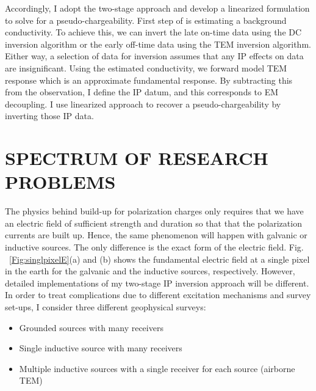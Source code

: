 \documentclass[letterpaper,11pt]{article}
\begin{document}


Accordingly, I adopt the two-stage approach and develop a linearized formulation to solve for a pseudo-chargeability. First step of is estimating a background conductivity. To achieve this, we can invert the late on-time data using the DC inversion algorithm or the early off-time data using the TEM inversion algorithm. Either way, a selection of data for inversion assumes that any IP effects on data are insignificant. Using the estimated conductivity, we forward model TEM response which is an approximate fundamental response. By subtracting this from the observation, I define the IP datum, and this corresponds to EM decoupling. I use linearized approach to recover a pseudo-chargeability by inverting those IP data. 

\section{SPECTRUM OF RESEARCH PROBLEMS}
The physics behind build-up for polarization charges only requires that we have an electric field of sufficient strength and duration so that that the polarization currents are built up. Hence, the same phenomenon will happen with galvanic or inductive sources. The only difference is the exact form of the electric field. Fig. ~\ref{Fig:singlpixelE}(a) and (b) shows the fundamental electric field at a single pixel in the earth for the galvanic and the inductive sources, respectively. However, detailed implementations of my two-stage IP inversion approach will be different. In order to treat complications due to different excitation mechanisms and survey set-ups, I consider three different geophysical surveys:
\begin{itemize}
  \item Grounded sources with many receivers
  \item Single inductive source with many receivers
  \item Multiple inductive sources with a single receiver for each source (airborne TEM)
\end{itemize}
\end{document}

